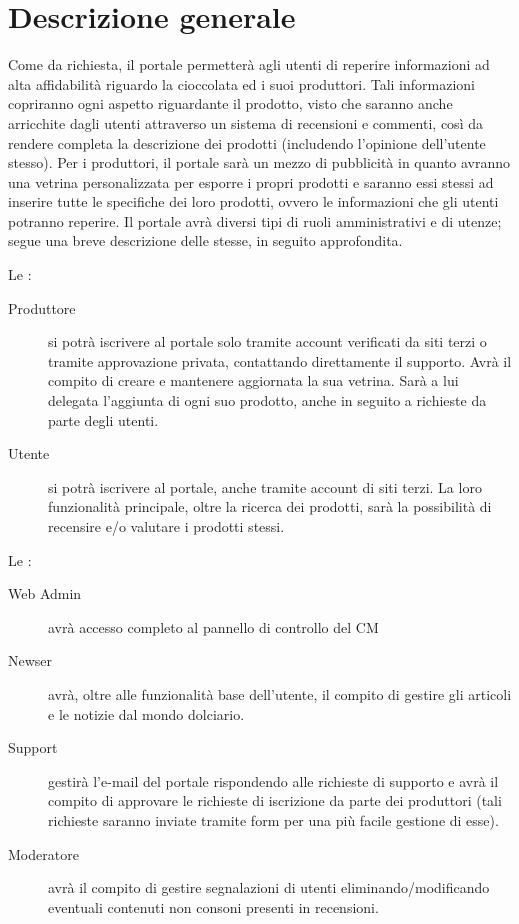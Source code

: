 \section{Descrizione generale}
Come da richiesta, il portale permetterà agli utenti di reperire informazioni ad alta affidabilità riguardo la cioccolata ed i suoi produttori.
Tali informazioni copriranno ogni aspetto riguardante il prodotto, visto che saranno anche arricchite dagli utenti attraverso un sistema di recensioni e commenti, così da rendere completa la descrizione dei prodotti (includendo l'opinione dell'utente stesso).
Per i produttori, il portale sarà un mezzo di pubblicità in quanto avranno una vetrina personalizzata per esporre i propri prodotti e saranno essi stessi ad inserire tutte le specifiche dei loro prodotti, ovvero le informazioni che gli utenti potranno reperire.
Il portale avrà diversi tipi di ruoli amministrativi e di utenze; segue una breve descrizione delle stesse, in seguito approfondita. 
\begin{description}
	\item Le : 
			\begin{description}
				\item[Produttore] si potrà iscrivere al portale solo tramite account verificati da siti terzi o tramite approvazione privata, contattando direttamente il supporto. Avrà il compito di creare e mantenere aggiornata la sua vetrina. Sarà a lui delegata l’aggiunta di ogni suo prodotto, anche in seguito a richieste da parte degli utenti.
				
				\item[Utente] si potrà iscrivere al portale, anche tramite account di siti terzi. La loro funzionalità principale, oltre la ricerca dei prodotti, sarà la possibilità di recensire e/o valutare i prodotti stessi. 
			\end{description}
			
	\item Le :
			\begin{description}
				\item[Web Admin] avrà accesso completo al pannello di controllo del CM
				
				\item[Newser] avrà, oltre alle funzionalità base dell’utente, il compito di gestire gli articoli e le notizie dal mondo dolciario.
				
				\item[Support] gestirà l’e-mail del portale rispondendo alle richieste di supporto e avrà il compito di approvare le richieste di iscrizione da parte dei produttori (tali richieste saranno inviate tramite form per una più facile gestione di esse).
				
				\item[Moderatore] avrà il compito di gestire segnalazioni di utenti eliminando/modificando eventuali contenuti non consoni presenti in recensioni.
			\end{description}
\end{description}

